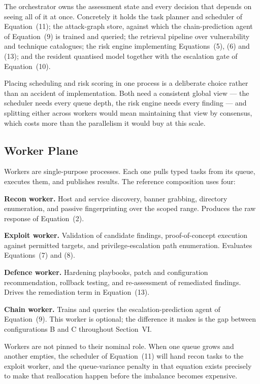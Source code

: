 \documentclass[journal]{IEEEtran}
\begin{document}
The orchestrator owns the assessment state and every decision that depends on
seeing all of it at once. Concretely it holds the task planner and scheduler
of Equation~(11); the attack-graph store, against which the chain-prediction
agent of Equation~(9) is trained and queried; the retrieval pipeline over
vulnerability and technique catalogues; the risk engine implementing
Equations~(5), (6) and (13); and the resident quantised model together with
the escalation gate of Equation~(10).

Placing scheduling and risk scoring in one process is a deliberate choice
rather than an accident of implementation. Both need a consistent global view
--- the scheduler needs every queue depth, the risk engine needs every
finding --- and splitting either across workers would mean maintaining that
view by consensus, which costs more than the parallelism it would buy at this
scale.

\subsection{Worker Plane}

Workers are single-purpose processes. Each one pulls typed tasks from its
queue, executes them, and publishes results. The reference composition uses
four:

\textbf{Recon worker.} Host and service discovery, banner grabbing, directory
enumeration, and passive fingerprinting over the scoped range. Produces the
raw response of Equation~(2).

\textbf{Exploit worker.} Validation of candidate findings, proof-of-concept
execution against permitted targets, and privilege-escalation path
enumeration. Evaluates Equations~(7) and (8).

\textbf{Defence worker.} Hardening playbooks, patch and configuration
recommendation, rollback testing, and re-assessment of remediated findings.
Drives the remediation term in Equation~(13).

\textbf{Chain worker.} Trains and queries the escalation-prediction agent of
Equation~(9). This worker is optional; the difference it makes is the gap
between configurations B and C throughout Section~VI.

Workers are not pinned to their nominal role. When one queue grows and another
empties, the scheduler of Equation~(11) will hand recon tasks to the exploit
worker, and the queue-variance penalty in that equation exists precisely to
make that reallocation happen before the imbalance becomes expensive.
\end{document}
